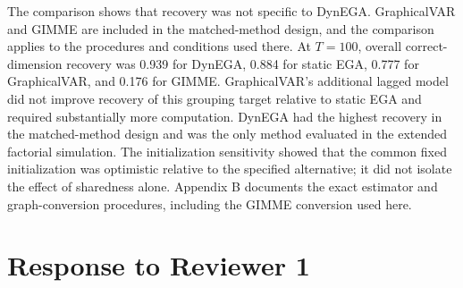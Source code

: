\documentclass[11pt]{article}
\begin{document}
\begin{enumerate}[resume]
  The comparison shows that recovery was not specific to DynEGA. GraphicalVAR and GIMME are included in the matched-method design, and the comparison applies to the procedures and conditions used there. At \(T=100\), overall correct-dimension recovery was 0.939 for DynEGA, 0.884 for static EGA, 0.777 for GraphicalVAR, and 0.176 for GIMME. GraphicalVAR's additional lagged model did not improve recovery of this grouping target relative to static EGA and required substantially more computation. DynEGA had the highest recovery in the matched-method design and was the only method evaluated in the extended factorial simulation. The initialization sensitivity showed that the common fixed initialization was optimistic relative to the specified alternative; it did not isolate the effect of sharedness alone. Appendix B documents the exact estimator and graph-conversion procedures, including the GIMME conversion used here.
\end{enumerate}

\section*{Response to Reviewer 1}
\end{document}
